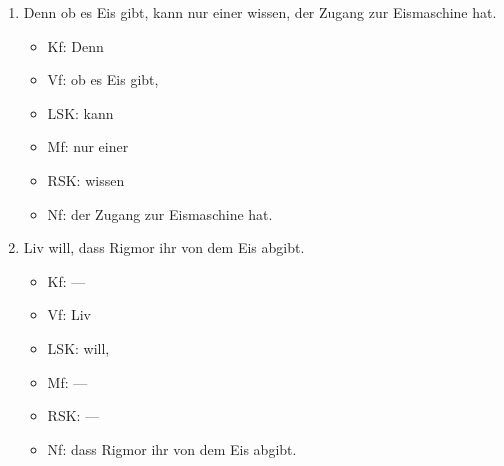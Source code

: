 \begin{enumerate}
\begin{itemize}
    \end{itemize}
  \item Denn ob es Eis gibt, kann nur einer wissen, der Zugang zur Eismaschine hat.
    \begin{itemize}\Lf
      \item Kf: Denn
      \item Vf: ob es Eis gibt,
      \item LSK: kann
      \item Mf: nur einer
      \item RSK: wissen
      \item Nf: der Zugang zur Eismaschine hat.
    \end{itemize}
  \item Liv will, dass Rigmor ihr von dem Eis abgibt.
    \begin{itemize}\Lf
      \item Kf: ---
      \item Vf: Liv
      \item LSK: will,
      \item Mf: ---
      \item RSK: ---
      \item Nf: dass Rigmor ihr von dem Eis abgibt.
    \end{itemize}
\end{enumerate}


